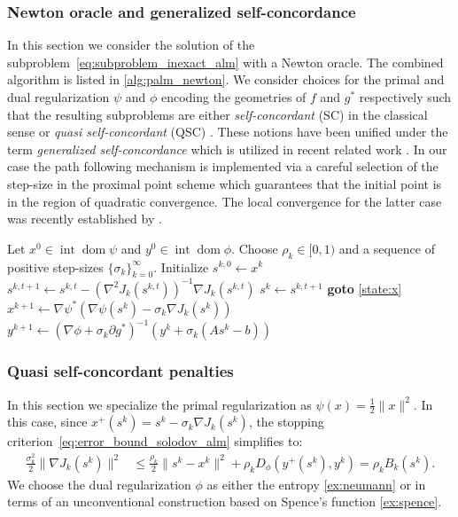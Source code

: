\documentclass[11pt,onecolumn]{article}
\DeclareMathOperator{\dom}{dom}
\DeclareMathOperator{\intr}{int}
\theoremstyle{remark}
\begin{document}
\subsubsection{Newton oracle and generalized self-concordance}
In this section we consider the solution of the subproblem~\cref{eq:subproblem_inexact_alm} with a Newton oracle. The combined algorithm is listed in \cref{alg:palm_newton}. We consider choices for the primal and dual regularization $\psi$ and $\phi$ encoding the geometries of $f$ and $g^*$ respectively such that the resulting subproblems are either \emph{self-concordant} (SC) in the classical sense \cite{nesterov1994interior,} or \emph{quasi self-concordant} (QSC) \cite{bach2010self}. 
These notions have been unified under the term \emph{generalized self-concordance} \cite{sun2019generalized} which is utilized in recent related work \cite{dvurechensky2019generalized}.
In our case the path following mechanism is implemented via a careful selection of the step-size in the proximal point scheme which guarantees that the initial point is in the region of quadratic convergence.
The local convergence for the latter case was recently established by \cite{doikov2025minimizing}.
\begin{algorithm}[t!]
\caption{Bregman Proximal Augmented Lagrangian Method with Newton Oracle}
\label{alg:palm_newton}
\begin{algorithmic}[1]
\REQUIRE Let $x^0\in \intr \dom \psi$ and $y^0 \in \intr \dom \phi$. Choose $\rho_k \in [0, 1)$ and a sequence of positive step-sizes $\{\sigma_k\}_{k=0}^\infty$.
    \STATE Initialize $s^{k,0}\gets x^k$
        \STATE $s^{k,t+1} \gets s^{k,t} - (\nabla^2 J_k(s^{k,t}))^{-1}\nabla J_k(s^{k,t})$
        \STATE $s^k \gets s^{k,t+1}$
        \STATE \textbf{goto} \ref{state:x}
        \ENDIF
    \ENDFOR
    \STATE \label{state:x}$x^{k+1} \gets \nabla \psi^*(\nabla \psi(s^k) - \sigma_k \nabla J_k(s^k))$
    \STATE $y^{k+1} \gets (\nabla \phi + \sigma_k\partial g^*)^{-1}(y^k + \sigma_k (As^k - b))$
\ENDFOR
\end{algorithmic}
\end{algorithm}

\subsubsection{Quasi self-concordant penalties}
In this section we specialize the primal regularization as $\psi(x)=\frac{1}{2}\|x\|^2$. In this case, since $x^+(s^k)=s^k - \sigma_k \nabla J_k(s^k)$, the stopping criterion~\cref{eq:error_bound_solodov_alm} simplifies to:
\begin{align}\label{eq:error_bound_solodov_alm_quadratic}
\tfrac{\sigma_k^2}{2}\| \nabla J_k(s^k)\|^2&\leq  \tfrac{\rho_k}{2}\|s^{k}-x^k\|^2 + \rho_k D_\phi(y^{+}(s^k), y^k) = \rho_k B_k(s^k).
\end{align}
We choose the dual regularization $\phi$ as either the entropy \cref{ex:neumann} or in terms of an unconventional construction based on Spence's function \cref{ex:spence}.
\end{document}
